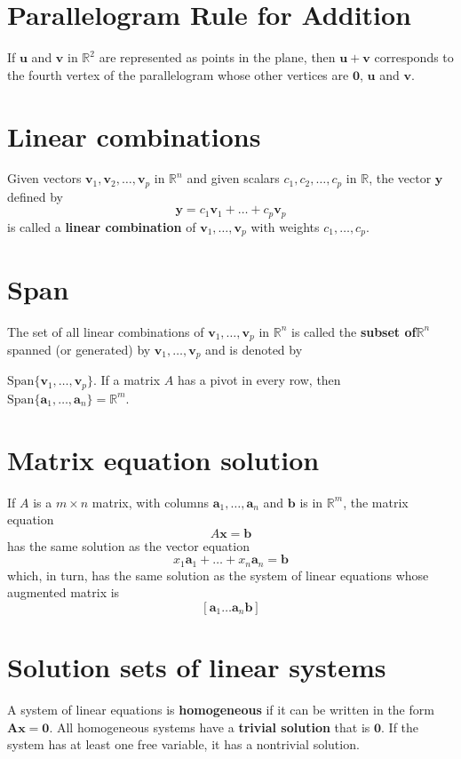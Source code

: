 \documentclass[oneside]{book} %
\theoremstyle{plain}
\begin{document}
\section{Parallelogram Rule for Addition}
If \(\mathbf{u}\) and \(\mathbf{v}\) in \(\mathbb{R}^2\)
are represented as points in the plane,
then \(\mathbf{u} + \mathbf{v}\) corresponds to the fourth vertex of the
parallelogram whose other vertices are \(\mathbf{0}\), \(\mathbf{u}\) and
\(\mathbf{v}\).

\section{Linear combinations}
Given vectors \(\mathbf{v}_1, \mathbf{v}_2, \ldots, \mathbf{v}_p\) in
\(\mathbb{R}^n\) and given scalars \(c_1, c_2, \ldots, c_p\) in \(\mathbb{R}\),
the vector \(\mathbf{y}\) defined by
\[ \mathbf{y} = c_1 \mathbf{v}_1 + \ldots + c_p \mathbf{v}_p \]
is called a \textbf{linear combination} of
\(\mathbf{v}_1, \ldots, \mathbf{v}_p\) with weights \(c_1, \ldots, c_p\).

\section{Span}
The set of all linear combinations of \(\mathbf{v}_1, \ldots, \mathbf{v}_p\) in
\(\mathbb{R}^n\) is called the \textbf{subset of}\(\mathbb{R}^n\) spanned (or
generated) by \(\mathbf{v}_1, \ldots, \mathbf{v}_p\) and is denoted by

\(\mathrm{Span}\{\mathbf{v}_1, \ldots, \mathbf{v}_p\}\). If a matrix \(A\) has a
pivot in every row, then \(\mathrm{Span} \{\mathbf{a}_1, \ldots, \mathbf{a}_n\}
= \mathbb{R}^m\).

\section{Matrix equation solution}
If \(A\) is a \(m \times n\) matrix, with columns \(\mathbf{a}_1, \ldots,
\mathbf{a}_n\) and \(\mathbf{b}\) is in \(\mathbb{R}^m\),
the matrix equation
\[ A\mathbf{x} = \mathbf{b} \]
has the same solution as the vector equation
\[ x_1\mathbf{a}_1 + \ldots + x_n\mathbf{a}_n = \mathbf{b} \]
which, in turn,
has the same solution as the system of linear equations whose
augmented matrix is
\[ [ \mathbf{a}_1 \ldots \mathbf{a}_n \mathbf{b} ] \]

\section{Solution sets of linear systems}
A system of linear equations is \textbf{homogeneous}
if it can be written in the form \( \mathbf{A x} = \mathbf{0} \).
All homogeneous systems have a \textbf{trivial solution} that is \(\mathbf{0}\).
If the system has at least one free variable, it has a nontrivial solution.
\end{document}
